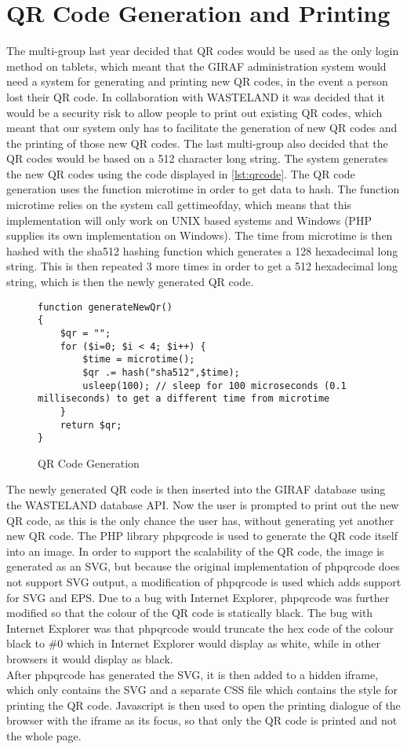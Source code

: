 \section{QR Code Generation and Printing}
The multi-group last year decided that QR codes would be used as the only login method on tablets, which meant that the GIRAF administration system would need a system for generating and printing new QR codes, in the event a person lost their QR code. In collaboration with WASTELAND it was decided that it would be a security risk to allow people to print out existing QR codes, which meant that our system only has to facilitate the generation of new QR codes and the printing of those new QR codes. The last multi-group also decided that the QR codes would be based on a 512 character long string. The system generates the new QR codes using the code displayed in \autoref{lst:qrcode}. The QR code generation uses the function microtime in order to get data to hash. The function microtime relies on the system call gettimeofday, which means that this implementation will only work on UNIX based systems and Windows (PHP supplies its own implementation on Windows). The time from microtime is then hashed with the sha512 hashing function which generates a 128 hexadecimal long string. This is then repeated 3 more times in order to get a 512 hexadecimal long string, which is then the newly generated QR code.
\begin{figure}[htbp]
\begin{lstlisting}
function generateNewQr()
{
	$qr = "";
	for ($i=0; $i < 4; $i++) { 
		$time = microtime();
		$qr .= hash("sha512",$time);
		usleep(100); // sleep for 100 microseconds (0.1 milliseconds) to get a different time from microtime
	}
	return $qr;
}
\end{lstlisting}
\caption{QR Code Generation}
\label{lst:qrcode}
\end{figure}
The newly generated QR code is then inserted into the GIRAF database using the WASTELAND database API. Now the user is prompted to print out the new QR code, as this is the only chance the user has, without generating yet another new QR code. The PHP library phpqrcode\citep{phpqrcode} is used to generate the QR code itself into an image. In order to support the scalability of the QR code, the image is generated as an SVG, but because the original implementation of phpqrcode does not support SVG output, a modification of phpqrcode is used\citep{phpqrcodet0k4rt} which adds support for SVG and EPS. Due to a bug with Internet Explorer, phpqrcode was further modified so that the colour of the QR code is statically black. The bug with Internet Explorer was that phpqrcode would truncate the hex code of the colour black to \#0 which in Internet Explorer would display as white, while in other browsers it would display as black. \\
After phpqrcode has generated the SVG, it is then added to a hidden iframe, which only contains the SVG and a separate CSS file which contains the style for printing the QR code. Javascript is then used to open the printing dialogue of the browser with the iframe as its focus, so that only the QR code is printed and not the whole page.

